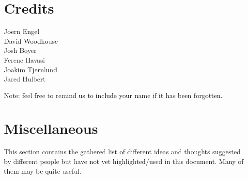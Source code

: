 \documentclass[12pt,a4paper,oneside,titlepage]{article}
\begin{document}
%
%
\section{Credits}
Joern Engel\\
David Woodhouse\\
Josh Boyer\\
Ferenc Havasi\\
Joakim Tjernlund\\
Jared Hulbert

\small{Note: feel free to remind us to include your name if it has been
forgotten.}

%
%
\section{Miscellaneous}
This section contains the gathered list of different ideas and thoughts
suggested by different people but have not yet highlighted/used in this
document. Many of them may be quite useful.
\end{document}
